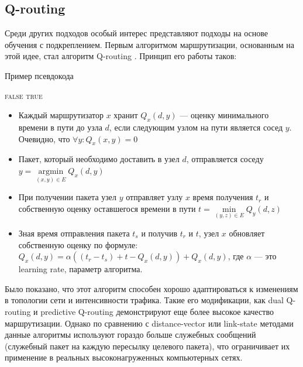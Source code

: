 \documentclass[specification,annotation,times]{itmo-student-thesis}
\DeclareMathOperator{\argmin}{argmin}
\theoremstyle{definition}
\begin{document}
\subsection{Q-routing}\label{q-routing-desc}

Среди других подходов особый интерес представляют подходы на основе обучения с
подкреплением. Первым алгоритмом маршрутизации, основанным на этой идее, стал
алгоритм Q-routing \cite{q-routing-orig}. Принцип его работы таков:

\begin{algorithm}[!h]
\caption{Пример псевдокода}\label{lst2}
\begin{algorithmic}
				\State\Return \textsc{false}
			\EndIf
		\EndFor
		\State\Return \textsc{true}
	\EndFunction
\end{algorithmic}
\end{algorithm}

\begin{itemize}
\item Каждый маршрутизатор $x$ хранит $Q_x(d, y)$ --- оценку минимального
  времени в пути до узла $d$, если следующим узлом на пути является сосед $y$.
  Очевидно, что $\forall y : Q_x(x, y) = 0$ 
\item Пакет, который необходимо доставить в узел $d$, отправляется соседу
  $y = \argmin\limits_{(x, y) \in E} Q_x(d, y)$
\item При получении пакета узел $y$ отправляет узлу $x$ время получения $t_r$ и
  собственную оценку оставшегося времени в пути
  $t = \min\limits_{(y, z) \in E} Q_y(d, z)$
\item Зная время отправления пакета $t_s$ и получив $t_r$ и $t$, узел $x$
  обновляет собственную оценку по формуле:
  $Q_x(d, y) = \alpha((t_r - t_s) + t - Q_x(d, y)) + Q_x(d, y)$,
  где $\alpha$ --- это learning rate, параметр алгоритма.
\end{itemize}

Было показано, что этот алгоритм способен хорошо адаптироваться к изменениям в
топологии сети и интенсивности трафика. Такие его модификации, как dual
Q-routing \cite{dual-q-routing} и predictive Q-routing \cite{predictive-q-routing}
демонстрируют еще более высокое качество маршрутизации. Однако по сравнению с
distance-vector или link-state методами данные алгоритмы используют гораздо
больше служебных сообщений (служебный пакет на каждую пересылку целевого
пакета), что ограничивает их применение в реальных высоконагруженных
компьютерных сетях.
\end{document}

